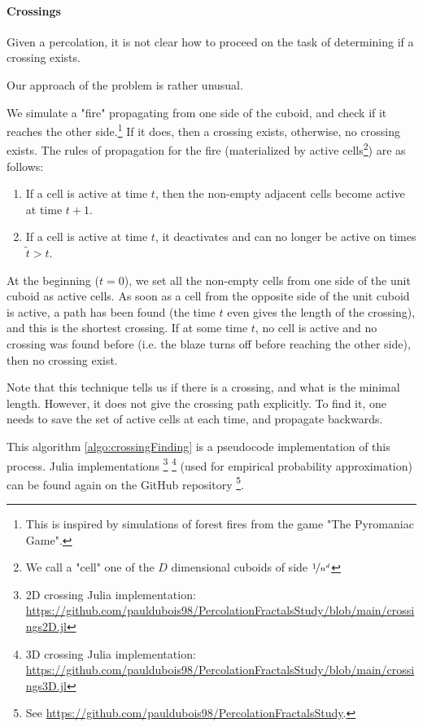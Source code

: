 \paragraph{Crossings}\label{crossingAlgorithm}
Given a percolation, it is not clear how to proceed on the task of determining if a crossing exists.

Our approach of the problem is rather unusual.

We simulate a "fire" propagating from one side of the cuboid, and check if it reaches the other side.\footnote{This is inspired by simulations of forest fires from the game "The Pyromaniac Game"\cite{pyromaniacGame}.}
If it does, then a crossing exists, otherwise, no crossing exists.
The rules of propagation for the fire (materialized by active cells\footnote{We call a "cell" one of the $D$ dimensional cuboids of side $\nicefrac{1}{n^d}$}) are as follows:
\begin{enumerate}
	\item If a cell is active at time $t$, then the non-empty adjacent cells become active at time $t+1$.
	\item If a cell is active at time $t$, it deactivates and can no longer be active on times $\tilde{t}>t$.
\end{enumerate}
At the beginning ($t=0$), we set all the non-empty cells from one side of the unit cuboid as active cells.
As soon as a cell from the opposite side of the unit cuboid is active, a path has been found (the time $t$ even gives the length of the crossing), and this is the shortest crossing.
If at some time $t$, no cell is active and no crossing was found before (i.e. the blaze turns off before reaching the other side), then no crossing exist.

Note that this technique tells us if there is a crossing, and what is the minimal length. However, it does not give the crossing path explicitly.
To find it, one needs to save the set of active cells at each time, and propagate backwards.

This algorithm \ref{algo:crossingFinding} is a pseudocode implementation of this process.
Julia implementations
\footnote{2D crossing Julia implementation: \url{https://github.com/pauldubois98/PercolationFractalsStudy/blob/main/crossings2D.jl}}
\footnote{3D crossing Julia implementation: \url{https://github.com/pauldubois98/PercolationFractalsStudy/blob/main/crossings3D.jl}}
(used for empirical probability approximation) can be found again on the GitHub repository
\footnote{See \url{https://github.com/pauldubois98/PercolationFractalsStudy}.}.

